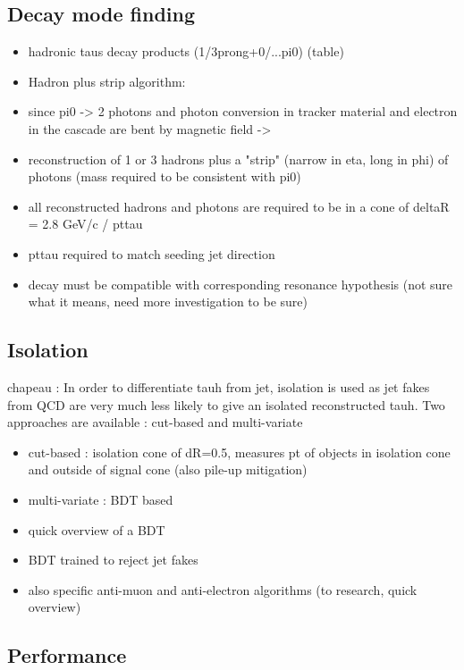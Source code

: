 \subsection{Decay mode finding}

\begin{itemize}
    \item hadronic taus decay products (1/3prong+0/...pi0) (table)
    \item Hadron plus strip algorithm:
    \item since pi0 -> 2 photons and photon conversion in tracker material and electron in the cascade are bent by magnetic field ->
    \item reconstruction of 1 or 3 hadrons plus a "strip" (narrow in eta, long in phi) of photons (mass required to be consistent with pi0)
    \item all reconstructed hadrons and photons are required to be in a cone of deltaR = 2.8 GeV/c / pttau
    \item pttau required to match seeding jet direction
    \item decay must be compatible with corresponding resonance hypothesis (not sure what it means, need more investigation to be sure)
\end{itemize}

\subsection{Isolation}
chapeau : In order to differentiate tauh from jet, isolation is used as jet fakes from QCD are very much less likely to give an isolated reconstructed tauh. Two approaches are available : cut-based and multi-variate

\begin{itemize}
    \item cut-based : isolation cone of dR=0.5, measures pt of objects in isolation cone and outside of signal cone (also pile-up mitigation)
    \item multi-variate : BDT based
    \item quick overview of a BDT
    \item BDT trained to reject jet fakes
    \item also specific anti-muon and anti-electron algorithms (to research, quick overview)
\end{itemize}

\subsection{Performance}

